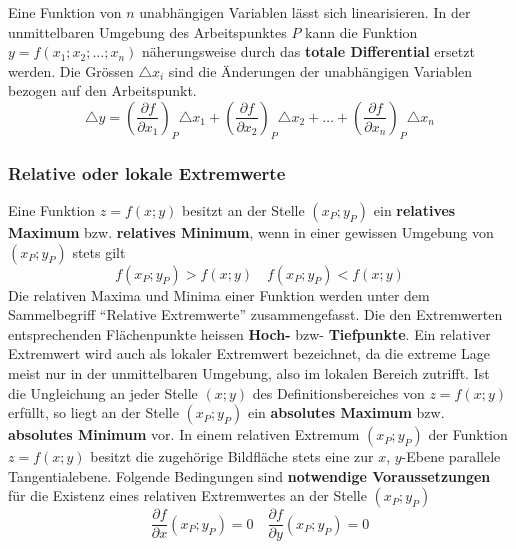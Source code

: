 \newline\newline
Eine Funktion von $n$ unabhängigen Variablen lässt sich linearisieren. In der unmittelbaren Umgebung des Arbeitspunktes $P$ kann die Funktion $y=f\left(x_1; x_2;\dotso; x_n\right)$ näherungsweise durch das \textbf{totale Differential} ersetzt werden. Die Grössen $\triangle x_i$ sind die Änderungen der unabhängigen Variablen bezogen auf den Arbeitspunkt.
\begin{equation}
\boxed{\triangle y=\left(\dfrac{\partial f}{\partial x_1}\right)_P\triangle x_1+\left(\dfrac{\partial f}{\partial x_2}\right)_P\triangle x_2+\dotso+\left(\dfrac{\partial f}{\partial x_n}\right)_P\triangle x_n}
\end{equation}
\subsubsection{Relative oder lokale Extremwerte}
Eine Funktion $z=f\left(x; y\right)$ besitzt an der Stelle $\left(x_P; y_P\right)$ ein \textbf{relatives Maximum} bzw. \textbf{relatives Minimum}, wenn in einer gewissen Umgebung von $\left(x_P; y_P\right)$ stets gilt
\begin{equation}
\boxed{f\left(x_P; y_P\right)>f\left(x; y\right)}\quad \boxed{f\left(x_P; y_P\right)<f\left(x; y\right)}
\end{equation}
Die relativen Maxima und Minima einer Funktion werden unter dem Sammelbegriff ``Relative Extremwerte'' zusammengefasst. Die den Extremwerten entsprechenden Flächenpunkte heissen \textbf{Hoch-} bzw- \textbf{Tiefpunkte}. Ein relativer Extremwert wird auch als lokaler Extremwert bezeichnet, da die extreme Lage meist nur in der unmittelbaren Umgebung, also im lokalen Bereich zutrifft. Ist die Ungleichung an jeder Stelle $\left(x; y\right)$ des Definitionsbereiches von $z=f\left(x; y\right)$ erfüllt, so liegt an der Stelle $\left(x_P; y_P\right)$ ein \textbf{absolutes Maximum} bzw. \textbf{absolutes Minimum} vor. 
\newline\newline
In einem relativen Extremum $\left(x_P; y_P\right)$ der Funktion $z=f\left(x; y\right)$ besitzt die zugehörige Bildfläche stets eine zur $x$, $y$-Ebene parallele Tangentialebene. Folgende Bedingungen sind \textbf{notwendige Voraussetzungen} für die Existenz eines relativen Extremwertes an der Stelle $\left(x_P; y_P\right)$
\begin{equation}
\boxed{\dfrac{\partial f}{\partial x}\left(x_P; y_P\right)=0}\quad \boxed{\dfrac{\partial f}{\partial y}\left(x_P; y_P\right)=0}
\end{equation}
